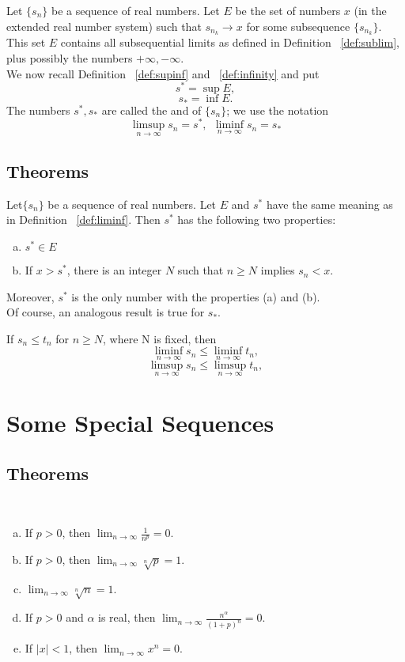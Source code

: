 \begin{deff}\label{def:liminf}
	Let $\{s_n\}$ be a sequence of real numbers. Let $E$ be the set of numbers $x$ (in the extended real number system) such that $s_{n_k}\to x$ for some subsequence $\{s_{n_k}\}$. This set $E$ contains all subsequential limits as defined in Definition ~\ref{def:sublim}, plus possibly the numbers $+\infty, -\infty$.\\
	We now recall Definition ~\ref{def:supinf} and ~\ref{def:infinity} and put $$s^*=\sup E,$$ $$s_*=\inf E.$$ The numbers $s^*, s_*$ are called the {} and {} of $\{s_n\}$; we use the notation $$\limsup\limits_{n\rightarrow\infty}s_n=s^*,~~\liminf\limits_{n\rightarrow\infty}s_n=s_*$$
\end{deff}

\subsection{Theorems}
\begin{thm}
	Let$\{s_n\}$ be a sequence of real numbers. Let $E$ and $s^*$ have the same meaning as in Definition ~\ref{def:liminf}. Then $s^*$ has the following two properties:
	\begin{enumerate}[(a)]
		\item $s^*\in E$
		\item If $x>s^*$, there is an integer $N$ such that $n\geq N$ implies $s_n<x$.
	\end{enumerate}
	Moreover, $s^*$ is the only number with the properties (a) and (b). \\
	Of course, an analogous result is true for $s_*$.
\end{thm}

\begin{thm}
	If $s_n\leq t_n$ for $n\geq N$, where N is fixed, then
	$$\liminf\limits_{n\rightarrow\infty}s_n\leq \liminf\limits_{n\rightarrow\infty}t_n,$$
	$$\limsup\limits_{n\rightarrow\infty}s_n\leq \limsup\limits_{n\rightarrow\infty}t_n,$$
\end{thm}

\section{Some Special Sequences}
\subsection{Theorems}
\begin{thm}
~
	\begin{enumerate}[(a)]
			\item If $p>0$, then $\lim_{n\to\infty}\frac{1}{n^p}=0$.
			\item If $p>0$, then $\lim_{n\to\infty}\sqrt[n] p=1$.
			\item $\lim_{n\to\infty} \sqrt[n]{n}=1.$
			\item If $p>0$ and $\alpha$ is real, then $\lim_{n\to\infty}\frac{n^\alpha}{(1+p)^n}=0$.
			\item If $|x|<1$, then $\lim_{n\to\infty}x^n=0$.
	\end{enumerate}
\end{thm}

